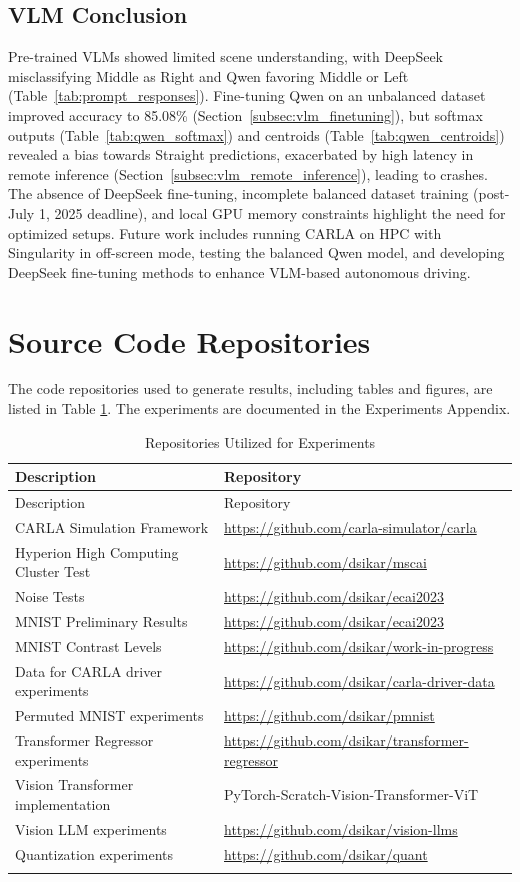 \subsection{VLM Conclusion}
\label{subsec:vlm_conclusion}
Pre-trained VLMs showed limited scene understanding, with DeepSeek misclassifying Middle as Right and Qwen favoring Middle or Left (Table~\ref{tab:prompt_responses}). Fine-tuning Qwen on an unbalanced dataset improved accuracy to 85.08\% (Section~\ref{subsec:vlm_finetuning}), but softmax outputs (Table~\ref{tab:qwen_softmax}) and centroids (Table~\ref{tab:qwen_centroids}) revealed a bias towards Straight predictions, exacerbated by high latency in remote inference (Section~\ref{subsec:vlm_remote_inference}), leading to crashes. The absence of DeepSeek fine-tuning, incomplete balanced dataset training (post-July 1, 2025 deadline), and local GPU memory constraints highlight the need for optimized setups. Future work includes running CARLA on HPC with Singularity in off-screen mode, testing the balanced Qwen model, and developing DeepSeek fine-tuning methods to enhance VLM-based autonomous driving.

\section{Source Code Repositories}
The code repositories used to generate results, including tables and figures, are listed in Table \ref{tab:thesis_repositories}.
The experiments are documented in the Experiments Appendix.

\begin{longtable}{@{}ll@{}}
\toprule
Description & Repository \\
\midrule
\endfirsthead
\toprule
Description & Repository \\
\midrule
\endhead
CARLA Simulation Framework & \url{https://github.com/carla-simulator/carla} \\
Hyperion High Computing Cluster Test & \url{https://github.com/dsikar/mscai} \\
Noise Tests & \url{https://github.com/dsikar/ecai2023} \\
MNIST Preliminary Results & \url{https://github.com/dsikar/ecai2023} \\
MNIST Contrast Levels & \url{https://github.com/dsikar/work-in-progress} \\
Data for CARLA driver experiments & \url{https://github.com/dsikar/carla-driver-data} \\
Permuted MNIST experiments & \url{https://github.com/dsikar/pmnist} \\
Transformer Regressor experiments & \url{https://github.com/dsikar/transformer-regressor} \\
Vision Transformer implementation & PyTorch-Scratch-Vision-Transformer-ViT \\
Vision LLM experiments & \url{https://github.com/dsikar/vision-llms} \\
Quantization experiments & \url{https://github.com/dsikar/quant} \\
\bottomrule
\caption{Repositories Utilized for Experiments}
\label{tab:thesis_repositories}
\end{longtable}